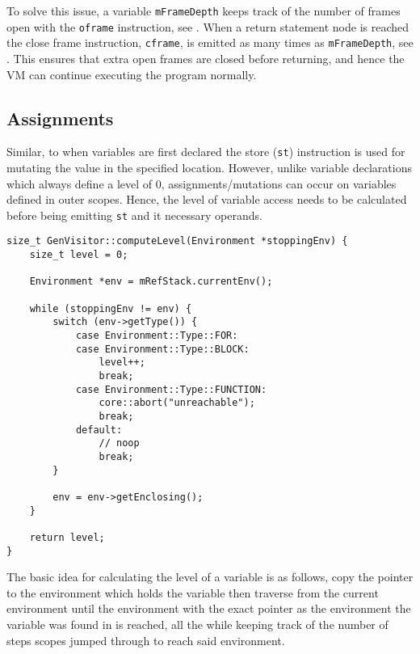 To solve this issue, a variable \texttt{mFrameDepth} keeps track
of the number of frames open with the \texttt{oframe}
instruction, see . When a return statement
node is reached the close frame instruction, \texttt{cframe}, is
emitted as many times as \texttt{mFrameDepth}, see
. This ensures that extra open frames are
closed before returning, and hence the VM can continue executing
the program normally.

\subsection{Assignments}

Similar, to when variables are first declared the store
(\texttt{st}) instruction is used for mutating the value in the
specified location. However, unlike variable declarations which
always define a level of $0$, assignments/mutations can occur on
variables defined in outer scopes. Hence, the level of variable
access needs to be calculated before being emitting \texttt{st}
and it necessary operands.

\begin{lstlisting}[caption={The \texttt{computeLevel()} method
in the \texttt{GenVisitor} class (ir\_gen/GenVisitor.cpp)},
label=lst:computelevel]
size_t GenVisitor::computeLevel(Environment *stoppingEnv) {
    size_t level = 0;

    Environment *env = mRefStack.currentEnv();

    while (stoppingEnv != env) {
        switch (env->getType()) {
            case Environment::Type::FOR:
            case Environment::Type::BLOCK:
                level++;
                break;
            case Environment::Type::FUNCTION:
                core::abort("unreachable");
                break;
            default:
                // noop
                break;
        }

        env = env->getEnclosing();
    }

    return level;
}
\end{lstlisting}

The basic idea for calculating the level of a variable is
as follows, copy the pointer to the environment which holds
the variable then traverse from the current environment until
the environment with the exact pointer as the environment
the variable was found in is reached, all the while keeping track
of the number of steps scopes jumped through to reach said
environment.

